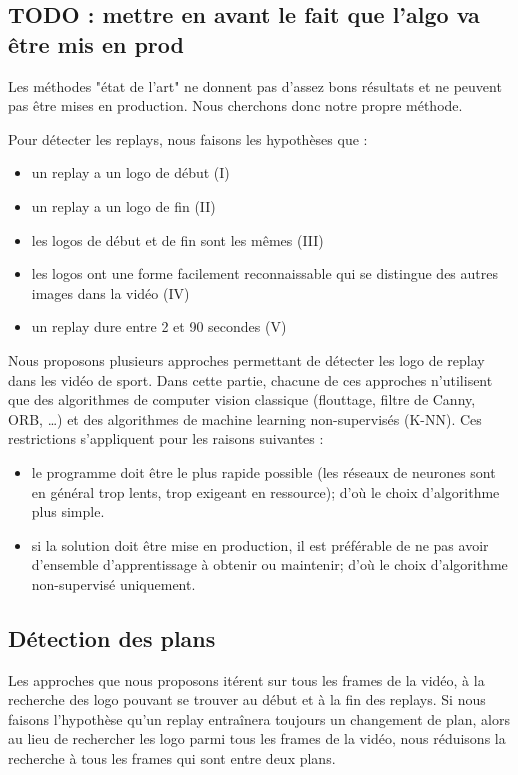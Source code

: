 \documentclass[11pt]{article}
\begin{document}
\subsection{{\bfseries\sffamily TODO} : mettre en avant le fait que l'algo va être mis en prod}
\label{sec-5-1}
Les méthodes "état de l'art" ne donnent pas d'assez bons résultats et ne peuvent 
pas être mises en production. Nous cherchons donc notre propre méthode.

Pour détecter les replays, nous faisons les hypothèses que :
\begin{itemize}
\item un replay a un logo de début (I)
\item un replay a un logo de fin (II)
\item les logos de début et de fin sont les mêmes (III)
\item les logos ont une forme facilement reconnaissable qui se distingue des  autres images dans la vidéo (IV)
\item un replay dure entre 2 et 90 secondes (V)
\end{itemize}

Nous proposons plusieurs approches permettant de détecter les logo de replay dans
les vidéo de sport. Dans cette partie, chacune de ces approches n'utilisent que des algorithmes
de computer vision classique (flouttage, filtre de Canny, ORB, \ldots{}) et des algorithmes de machine 
learning non-supervisés (K-NN).
Ces restrictions s'appliquent pour les raisons suivantes :
\begin{itemize}
\item le programme doit être le plus rapide possible (les réseaux de neurones sont en général trop lents,
trop exigeant en ressource); d'où le choix d'algorithme plus simple.
\item si la solution doit être mise en production, il est préférable de ne pas avoir d'ensemble d'apprentissage
à obtenir ou maintenir; d'où le choix d'algorithme non-supervisé uniquement.
\end{itemize}

\subsection{Détection des plans}
\label{sec-5-2}
Les approches que nous proposons itérent sur tous les frames de la vidéo, à la recherche des
logo pouvant se trouver au début et à la fin des replays. Si nous faisons l'hypothèse qu'un 
replay entraînera toujours un changement de plan, alors au lieu de rechercher les logo
parmi tous les frames de la vidéo, nous réduisons la recherche à tous les frames qui sont entre deux
plans.
\end{document}

